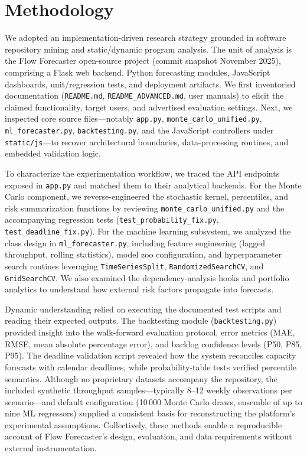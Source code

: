 \section{Methodology}
We adopted an implementation-driven research strategy grounded in software repository mining and static/dynamic program analysis. The unit of analysis is the Flow Forecaster open-source project (commit snapshot November 2025), comprising a Flask web backend, Python forecasting modules, JavaScript dashboards, unit/regression tests, and deployment artifacts. We first inventoried documentation (\texttt{README.md}, \texttt{README\_ADVANCED.md}, user manuals) to elicit the claimed functionality, target users, and advertised evaluation settings. Next, we inspected core source files---notably \texttt{app.py}, \texttt{monte\_carlo\_unified.py}, \texttt{ml\_forecaster.py}, \texttt{backtesting.py}, and the JavaScript controllers under \texttt{static/js}---to recover architectural boundaries, data-processing routines, and embedded validation logic.

To characterize the experimentation workflow, we traced the API endpoints exposed in \texttt{app.py} and matched them to their analytical backends. For the Monte Carlo component, we reverse-engineered the stochastic kernel, percentiles, and risk summarization functions by reviewing \texttt{monte\_carlo\_unified.py} and the accompanying regression tests (\texttt{test\_probability\_fix.py}, \texttt{test\_deadline\_fix.py}). For the machine learning subsystem, we analyzed the class design in \texttt{ml\_forecaster.py}, including feature engineering (lagged throughput, rolling statistics), model zoo configuration, and hyperparameter search routines leveraging \texttt{TimeSeriesSplit}, \texttt{RandomizedSearchCV}, and \texttt{GridSearchCV}. We also examined the dependency-analysis hooks and portfolio analytics to understand how external risk factors propagate into forecasts.

Dynamic understanding relied on executing the documented test scripts and reading their expected outputs. The backtesting module (\texttt{backtesting.py}) provided insight into the walk-forward evaluation protocol, error metrics (MAE, RMSE, mean absolute percentage error), and backlog confidence levels (P50, P85, P95). The deadline validation script revealed how the system reconciles capacity forecasts with calendar deadlines, while probability-table tests verified percentile semantics. Although no proprietary datasets accompany the repository, the included synthetic throughput samples---typically 8--12 weekly observations per scenario---and default configuration (10\,000 Monte Carlo draws, ensemble of up to nine ML regressors) supplied a consistent basis for reconstructing the platform's experimental assumptions. Collectively, these methods enable a reproducible account of Flow Forecaster's design, evaluation, and data requirements without external instrumentation.
